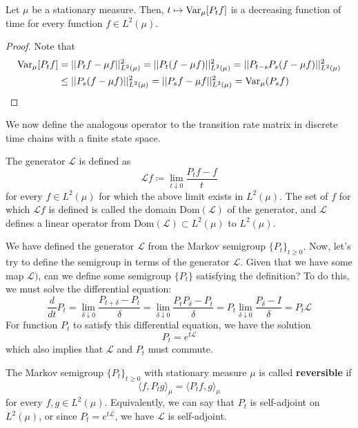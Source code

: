   \begin{lemma}
  Let $\mu$ be a stationary measure. Then, $t \mapsto \operatorname{Var}_\mu [P_t f]$ is a decreasing function of time for every function $f \in L^2 (\mu)$. 
  \end{lemma}
  \begin{proof}
  Note that 
  \begin{align*}
      \operatorname{Var}_\mu [P_t f] & = ||P_t f - \mu f||^2_{L^2(\mu) } =  ||P_t (f - \mu f)||^2_{L^2 (\mu)} = ||P_{t - s} P_s (f - \mu f)||^2_{L^2 (\mu)} \\
      & \leq ||P_s (f - \mu f)||^2_{L^2 (\mu)} = ||P_s f - \mu f||^2_{L^2 (\mu)} = \operatorname{Var}_\mu (P_s f)
  \end{align*}
  \end{proof}

  We now define the analogous operator to the transition rate matrix in discrete time chains with a finite state space. 

  \begin{definition}[Generator]
  The generator $\mathscr{L}$ is defined as 
  \[\mathscr{L} f \coloneqq \lim_{t \downarrow 0} \frac{P_t f - f}{t}\]
  for every $f \in L^2 (\mu)$ for which the above limit exists in $L^2 (\mu)$. The set of $f$ for which $\mathscr{L}f$ is defined is called the domain $\mathrm{Dom}(\mathscr{L})$ of the generator, and $\mathscr{L}$ defines a linear operator from $\mathrm{Dom}(\mathscr{L}) \subset L^2 (\mu)$ to $L^2 (\mu)$. 
  \end{definition}

  We have defined the generator $\mathscr{L}$ from the Markov semigroup $\{P_t\}_{t \geq 0}$. Now, let's try to define the semigroup in terms of the generator $\mathscr{L}$. Given that we have some map $\mathscr{L})$, can we define some semigroup $\{P_t\}$ satisfying the definition? To do this, we must solve the differential equation: 
  \[\frac{d}{dt} P_t = \lim_{\delta \downarrow 0} \frac{P_{t + \delta} - P_t}{\delta} = \lim_{\delta \downarrow 0} \frac{P_t P_\delta - P_t}{\delta} = P_t \lim_{\delta \downarrow 0} \frac{P_\delta - I}{\delta} = P_t \mathscr{L}\]
  For function $P_t$ to satisfy this differential equation, we have the solution 
  \[P_t = e^{t \mathscr{L}}\]
  which also implies that $\mathscr{L}$ and $P_t$ must commute. 

  \begin{definition}[Reversibility]
  The Markov semigroup $\{P_t\}_{t \geq 0}$ with stationary measure $\mu$ is called \textbf{reversible} if 
  \[\langle f, P_t g \rangle_\mu = \langle P_t f, g \rangle_\mu\]
  for every $f, g \in L^2 (\mu)$. Equivalently, we can say that $P_t$ is self-adjoint on $L^2 (\mu)$, or since $P_t = e^{t \mathscr{L}}$, we have $\mathscr{L}$ is self-adjoint. 
  \end{definition}

